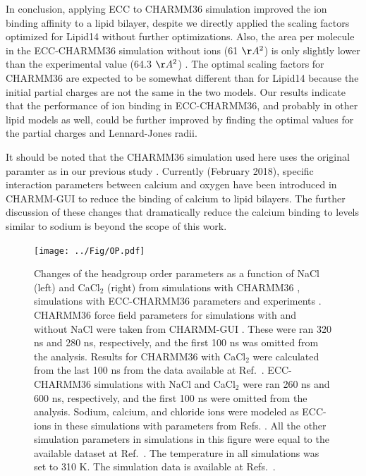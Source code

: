 \documentclass[journal=jpcbfk]{achemso}
\begin{document}
In conclusion, applying ECC to CHARMM36 simulation
improved the ion binding affinity to a lipid bilayer, despite we
directly applied the scaling factors optimized for Lipid14 without further optimizations. Also, the area per molecule in
the ECC-CHARMM36 simulation without ions (61 $\AA^2$) is only slightly
lower than the experimental value (64.3 $\AA^2$) \cite{kucerka11}. 
The optimal scaling factors for CHARMM36 are expected to be somewhat different
than for Lipid14 because the initial partial charges are not the same
in the two models. Our results indicate that the performance of ion
binding in ECC-CHARMM36, and probably in other lipid models as well, could
be further improved by finding the optimal values for the partial
charges and Lennard-Jones radii.

It should be noted that the CHARMM36 simulation used here uses the original paramter
as in our previous study \cite{catte16,charmmPOPC450mMCaClfiles}.
Currently (February 2018), specific interaction parameters
between calcium and oxygen \cite{kim16} have been introduced in CHARMM-GUI \cite{lee15}
to reduce the binding of calcium to lipid bilayers. The further discussion of these
changes that dramatically reduce the calcium binding to levels similar to sodium is beyond the
scope of this work.



\begin{figure}[!h]
  \centering
  \texttt{[image: ../Fig/OP.pdf]}
  \caption{\label{scaledCHARMM}
    Changes of the headgroup order parameters as a function of NaCl (left) and CaCl$_2$ (right)
    from simulations with CHARMM36 \cite{klauda10}, simulations with ECC-CHARMM36 parameters and experiments \cite{akutsu81,altenbach84}. 
    CHARMM36 force field parameters for simulations with and without NaCl were taken from CHARMM-GUI \cite{lee15}.
    These were ran 320 ns and 280 ns, respectively, and the first 100 ns was omitted from the analysis.
    Results for CHARMM36 with CaCl$_2$ were calculated from the last 100 ns from the data available at Ref.~.
    ECC-CHARMM36 simulations with NaCl and CaCl$_2$ were ran 260 ns and 600 ns, respectively, and the first 100 ns were omitted from the analysis.
    Sodium, calcium, and chloride ions were modeled as ECC-ions in these simulations with parameters from Refs. .
    All the other simulation parameters in simulations in this figure were equal to the available dataset at Ref.~.
    The temperature in all simulations was set to 310 K.
    The simulation data is available at Refs.~.
  }
\end{figure}
\end{document}
